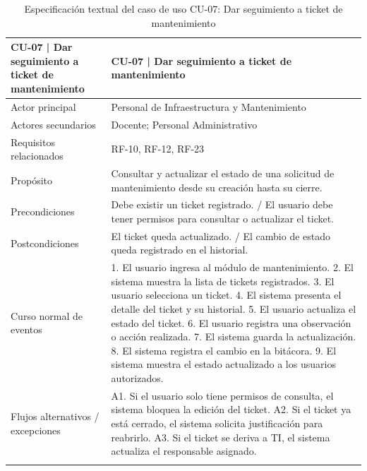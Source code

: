 \begingroup
\small
\begin{longtable}{|p{7.8cm}|p{7.8cm}|}
\hline
CU-07 | Dar seguimiento a ticket de mantenimiento & CU-07 | Dar seguimiento a ticket de mantenimiento \\ \hline
Actor principal & Personal de Infraestructura y Mantenimiento \\ \hline
Actores secundarios & Docente; Personal Administrativo \\ \hline
Requisitos relacionados & RF-10, RF-12, RF-23 \\ \hline
Propósito & Consultar y actualizar el estado de una solicitud de mantenimiento desde su creación hasta su cierre. \\ \hline
Precondiciones & Debe existir un ticket registrado. / El usuario debe tener permisos para consultar o actualizar el ticket. \\ \hline
Postcondiciones & El ticket queda actualizado. / El cambio de estado queda registrado en el historial. \\ \hline
Curso normal de eventos & 1. El usuario ingresa al módulo de mantenimiento. 2. El sistema muestra la lista de tickets registrados. 3. El usuario selecciona un ticket. 4. El sistema presenta el detalle del ticket y su historial. 5. El usuario actualiza el estado del ticket. 6. El usuario registra una observación o acción realizada. 7. El sistema guarda la actualización. 8. El sistema registra el cambio en la bitácora. 9. El sistema muestra el estado actualizado a los usuarios autorizados. \\ \hline
Flujos alternativos / excepciones & A1. Si el usuario solo tiene permisos de consulta, el sistema bloquea la edición del ticket. A2. Si el ticket ya está cerrado, el sistema solicita justificación para reabrirlo. A3. Si el ticket se deriva a TI, el sistema actualiza el responsable asignado. \\ \hline
\caption{Especificación textual del caso de uso CU-07: Dar seguimiento a ticket de mantenimiento}
\end{longtable}
\endgroup

